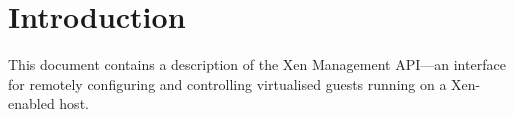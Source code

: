 \documentclass{report}
\begin{document}




\tableofcontents



\chapter{Introduction}

This document contains a description of the Xen Management API---an interface for
remotely configuring and controlling virtualised guests running on a
Xen-enabled host. 








\end{document}
